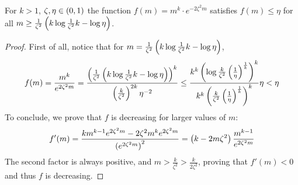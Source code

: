     \begin{lemma} \label{lem:ineq_5.13}
        For $k > 1$, $\zeta, \eta \in \left( 0,1 \right)$ the function $f(m) = m^k \cdot e^{-2 \zeta^2 m}$ satisfies
        $f(m) \leq \eta$ for all $m \geq \frac{1}{\zeta^2}\left( k \log{\frac{1}{\zeta^2} k} - \log{\eta} \right)$.
        \begin{proof}
            First of all, notice that for $m = \frac{1}{\zeta^2}\left( k \log{\frac{1}{\zeta^2} k} - \log{\eta} \right)$,
            \[
                f(m) = \frac{m^k}{e^{2 \zeta^2 m}}
                     = \frac{\left( \frac{1}{\zeta^2}\left( k \log{\frac{1}{\zeta^2} k} - \log{\eta} \right) \right)^k}{
                        \left( \frac{k}{\zeta^2} \right)^{2k} \eta^{-2}}
                     \leq \frac{k^k \left( \log{\frac{k}{\zeta^2}\left( \frac{1}{\eta} \right)^{\frac{1}{k}}} \right)^k}
                        {k^k \left( \frac{k}{\zeta^2} \left( \frac{1}{\eta} \right)^{\frac{1}{k}} \right)^k} \eta
                     < \eta
            \]
            To conclude, we prove that $f$ is decreasing for larger values of $m$:
            \[
                f'(m)
                    = \frac{k m^{k-1} e^{2 \zeta^2 m} - 2 \zeta^2 m^k e^{2 \zeta^2 m}}{\left( e^{2 \zeta^2 m} \right)^2}
                    = \left( k - 2m\zeta^2 \right) \frac{m^{k-1}}{e^{2 \zeta^2 m}}
            \]
            The second factor is always positive, and $m > \frac{k}{\zeta^2} > \frac{k}{2\zeta^2}$, proving that $f'(m) < 0$
            and thus $f$ is decreasing.
        \end{proof}
    \end{lemma}

